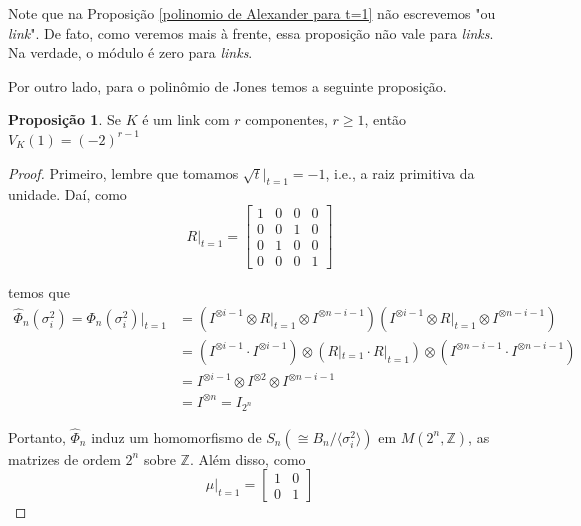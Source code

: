 \documentclass[a4paper,portuguese,11pt,twoside, leqno]{book}
\theoremstyle{definition}
\newtheorem{prop}{Proposição}[section]
\begin{document}
	\par\vspace{0.3cm} Note que na Proposição \eqref{polinomio de Alexander para t=1} não escrevemos "ou \textit{link}". De fato, como veremos mais à frente, essa proposição não vale para \textit{links}. Na verdade, o módulo é zero para \textit{links}. 
	\par\vspace{0.3cm} Por outro lado, para o polinômio de Jones temos a seguinte proposição.
	\begin{prop}
		\label{polinomio de Jones para links}
		Se $K$ é um link com $r$ componentes, $r\geq 1$, então $V_K(1) = (-2)^{r-1}$
	\end{prop}
	\begin{proof}
		Primeiro, lembre que tomamos $\sqrt{t}|_{t=1} = -1$, i.e., a raiz primitiva da unidade. Daí, como
		\begin{equation*}
		R|_{t=1} = \begin{bmatrix}
		1 & 0 & 0 & 0 \\
		0 & 0 & 1 & 0 \\
		0 & 1 & 0 & 0 \\
		0 & 0 & 0 & 1
		\end{bmatrix}
		\end{equation*}
		\par\vspace{0.3cm} temos que
		\begin{align*}
		\widehat{\Phi}_n(\sigma_i^2) = \Phi_n(\sigma_i^2)|_{t=1} &= ( I^{\otimes i-1} \otimes R|_{t=1} \otimes I^{\otimes n-i-1} )( I^{\otimes i-1} \otimes R|_{t=1} \otimes I^{\otimes n-i-1} ) \\
		&= ( I^{\otimes i-1}\cdot I^{\otimes i-1} )\otimes( R|_{t=1}\cdot R|_{t=1} )\otimes( I^{\otimes n-i-1}\cdot I^{\otimes n-i-1} ) \\
		&= I^{\otimes i-1}\otimes I^{\otimes 2}\otimes I^{\otimes n-i-1} \\
		&= I^{\otimes n} = I_{2^n}
		\end{align*}
		\par\vspace{0.3cm} Portanto, $\widehat{\Phi}_n$ induz um homomorfismo de $S_n ( \cong B_n/\langle \sigma_i^2 \rangle )$ em $M(2^n, \mathbb{Z})$, as matrizes de ordem $2^n$ sobre $\mathbb{Z}$. Além disso, como
		\begin{equation*}
		\mu|_{t=1} = \begin{bmatrix}
		1 & 0 \\
		0 & 1
		\end{bmatrix}

\end{equation*}
\end{proof}
\end{document}
